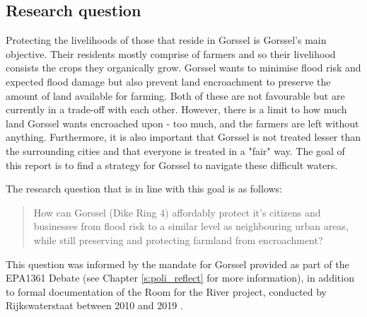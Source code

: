 


\subsection{Research question}

Protecting the livelihoods of those that reside in Gorssel is Gorssel's main objective. Their residents mostly comprise of farmers and so their livelihood consists the crops they organically grow. Gorssel wants to minimise flood risk and expected flood damage but also prevent land encroachment to preserve the amount of land available for farming. Both of these are not favourable but are currently in a trade-off with each other. However, there is a limit to how much land Gorssel wants encroached upon - too much, and the farmers are left without anything. Furthermore, it is also important that Gorssel is not treated lesser than the surrounding cities and that everyone is treated in a "fair" way. 
The goal of this report is to find a strategy for Gorssel to navigate these difficult waters. 


The research question that is in line with this goal is as follows: 
\begin{quote}
    How can Gorssel (Dike Ring 4) affordably protect it's citizens and businesses from flood risk to a similar level as neighbouring urban areas, while still preserving and protecting farmland from encroachment?
\end{quote}

This question was informed by the mandate for Gorssel provided as part of the EPA1361 Debate (see Chapter \ref{s:poli_reflect} for more information), in addition to formal documentation of the Room for the River project, conducted by Rijkswaterstaat between 2010 and 2019 \parencite{rijkswaterstaat_tailor_2013,rijke_room_2012}.

